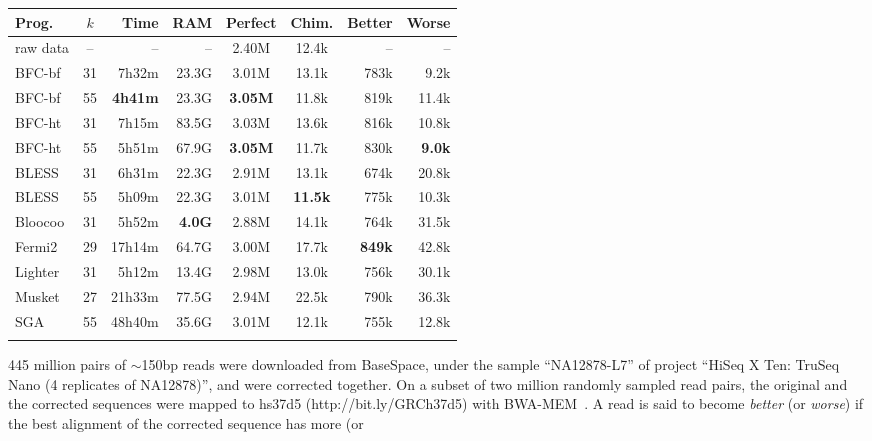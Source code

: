\documentclass{bioinfo}
\begin{document}
\begin{table}[t]
{\footnotesize
\begin{tabular}{lcrrccrr}
\toprule
Prog.     & $k$ & Time  & RAM   & Perfect&Chim.& Better & Worse \\
\midrule
raw data  & --  & --    & --    & 2.40M  & 12.4k  & --     & -- \\
BFC-bf    & 31  & 7h32m & 23.3G & 3.01M  & 13.1k  & 783k   & 9.2k \\
BFC-bf    & 55&{\bf 4h41m}&23.3G&{\bf 3.05M}&11.8k& 819k   & 11.4k \\
BFC-ht    & 31  & 7h15m & 83.5G & 3.03M  &13.6k   & 816k   & 10.8k \\
BFC-ht    & 55  & 5h51m & 67.9G &{\bf 3.05M}&11.7k& 830k   &{\bf 9.0k}\\
BLESS     & 31  & 6h31m & 22.3G & 2.91M  & 13.1k  & 674k   & 20.8k \\
BLESS     & 55  & 5h09m & 22.3G & 3.01M  &{\bf 11.5k}& 775k& 10.3k \\
Bloocoo   & 31  & 5h52m &{\bf 4.0G}&2.88M& 14.1k  & 764k   & 31.5k  \\
Fermi2    & 29  &17h14m & 64.7G & 3.00M  & 17.7k  &{\bf 849k}&42.8k \\
Lighter   & 31  & 5h12m & 13.4G & 2.98M  & 13.0k  & 756k   & 30.1k  \\
Musket    & 27  &21h33m & 77.5G & 2.94M  & 22.5k  & 790k   & 36.3k  \\
SGA       & 55  &48h40m & 35.6G & 3.01M  & 12.1k  & 755k   & 12.8k  \\
\botrule
\end{tabular}}{445 million pairs of $\sim$150bp reads were downloaded from
BaseSpace, under the sample ``NA12878-L7'' of project ``HiSeq X Ten: TruSeq
Nano (4 replicates of NA12878)'', and were corrected together. On a subset of
two million randomly sampled read pairs, the original and the corrected
sequences were mapped to hs37d5 (http://bit.ly/GRCh37d5) with
BWA-MEM~\citep{Li:2013aa}.  A read is said to become \emph{better} (or
\emph{worse}) if the best alignment of the corrected sequence has more (or
}
\end{table}
\end{document}
